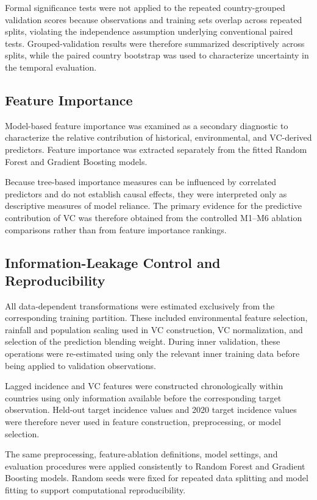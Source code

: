 \documentclass[10pt,twocolumn]{article}
\begin{document}
Formal significance tests were not applied to the repeated
country-grouped validation scores because observations and training
sets overlap across repeated splits, violating the independence
assumption underlying conventional paired tests. Grouped-validation
results were therefore summarized descriptively across splits, while
the paired country bootstrap was used to characterize uncertainty in
the temporal evaluation.


\subsection{Feature Importance}

Model-based feature importance was examined as a secondary diagnostic
to characterize the relative contribution of historical,
environmental, and VC-derived predictors. Feature importance was
extracted separately from the fitted Random Forest and Gradient
Boosting models.

Because tree-based importance measures can be influenced by correlated
predictors and do not establish causal effects, they were interpreted
only as descriptive measures of model reliance. The primary evidence
for the predictive contribution of VC was therefore obtained from the
controlled M1--M6 ablation comparisons rather than from feature
importance rankings.


\subsection{Information-Leakage Control and Reproducibility}

All data-dependent transformations were estimated exclusively from the
corresponding training partition. These included environmental
feature selection, rainfall and population scaling used in VC
construction, VC normalization, and selection of the prediction
blending weight. During inner validation, these operations were
re-estimated using only the relevant inner training data before being
applied to validation observations.

Lagged incidence and VC features were constructed chronologically
within countries using only information available before the
corresponding target observation. Held-out target incidence values and
2020 target incidence values were therefore never used in feature
construction, preprocessing, or model selection.

The same preprocessing, feature-ablation definitions, model settings,
and evaluation procedures were applied consistently to Random Forest
and Gradient Boosting models. Random seeds were fixed for repeated
data splitting and model fitting to support computational
reproducibility.
\end{document}
